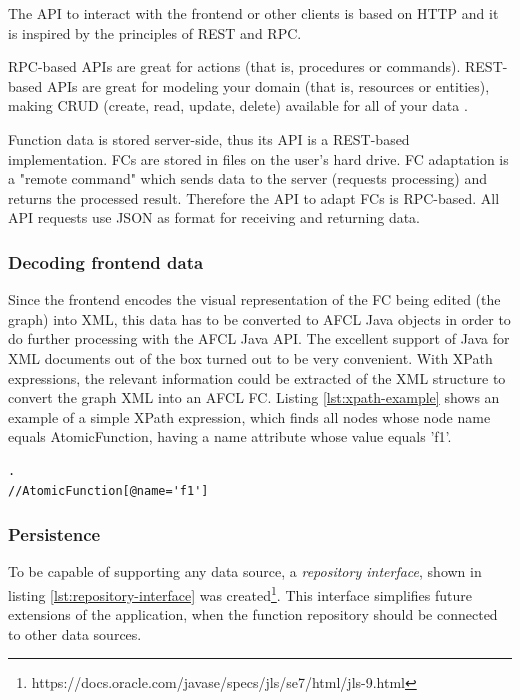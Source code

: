 \documentclass[a4paper,top=25mm,bottom=25mm,12pt,pdftex,halfparskip,twoside,openany,bibtotoc,numbers=noenddot]{scrbook}
\begin{document}
The API to interact with the frontend or other clients is based on HTTP and it is inspired by the principles of REST and RPC.

RPC-based APIs are great for actions (that is, procedures or commands).
REST-based APIs are great for modeling your domain (that is, resources or entities), making CRUD (create, read, update, delete) available for all of your data \cite{online-smashingmagazine-rest-vs-rpc}.

Function data is stored server-side, thus its API is a REST-based implementation. FCs are stored in files on the user's hard drive. FC adaptation is a "remote command" which sends data to the server (requests processing) and returns the processed result. Therefore the API to adapt FCs is RPC-based. All API requests use JSON as format for receiving and returning data.

\subsubsection{Decoding frontend data}
\label{sec:backend-decoding}

Since the frontend encodes the visual representation of the FC being edited (the graph) into XML, this data has to be converted to AFCL Java objects in order to do further processing with the AFCL Java API.
The excellent support of Java for XML documents out of the box turned out to be very convenient. With XPath expressions, the relevant information could be extracted of the XML structure to convert the graph XML into an AFCL FC. Listing \ref{lst:xpath-example} shows an example of a simple XPath expression, which finds all nodes whose node name equals \textsf{AtomicFunction}, having a \textsf{name} attribute whose value equals 'f1'.

\vspace{0.25cm}
\begin{lstlisting}[caption={Example of an XPath expression.},label={lst:xpath-example}].
//AtomicFunction[@name='f1']
\end{lstlisting}

\subsubsection{Persistence}
\label{sec:backend-persistence}

To be capable of supporting any data source, a \textit{repository interface}, shown in listing \ref{lst:repository-interface} was created\footnote{https://docs.oracle.com/javase/specs/jls/se7/html/jls-9.html}.
This interface simplifies future extensions of the application, when the function repository should be connected to other data sources.
\end{document}
